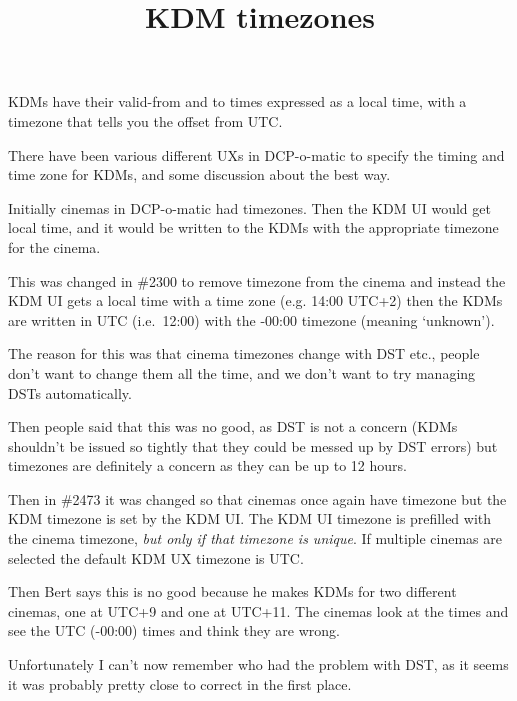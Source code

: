 \documentclass{article}
\title{KDM timezones}
\author{}
\date{}
\begin{document}
\maketitle

KDMs have their valid-from and to times expressed as a local time, with a timezone that tells you the offset from UTC.

There have been various different UXs in DCP-o-matic to specify the timing and time zone for KDMs, and some discussion
about the best way.

Initially cinemas in DCP-o-matic had timezones.  Then the KDM UI would get local time, and it would be written to the
KDMs with the appropriate timezone for the cinema.

This was changed in \#2300 to remove timezone from the cinema and instead the KDM UI gets a local time with a time zone
(e.g. 14:00 UTC+2) then the KDMs are written in UTC (i.e.\ 12:00) with the -00:00 timezone (meaning `unknown').

The reason for this was that cinema timezones change with DST etc., people don't want to change them all the time, and
we don't want to try managing DSTs automatically.

Then people said that this was no good, as DST is not a concern (KDMs shouldn't be issued so tightly that they could
be messed up by DST errors) but timezones are definitely a concern as they can be up to 12 hours.

Then in \#2473 it was changed so that cinemas once again have timezone but the KDM timezone is set by the KDM UI.
The KDM UI timezone is prefilled with the cinema timezone, \emph{but only if that timezone is unique}.  If multiple
cinemas are selected the default KDM UX timezone is UTC.

Then Bert says this is no good because he makes KDMs for two different cinemas, one at UTC+9 and one at UTC+11.
The cinemas look at the times and see the UTC (-00:00) times and think they are wrong.

Unfortunately I can't now remember who had the problem with DST, as it seems it was probably pretty close to correct
in the first place.
\end{document}
